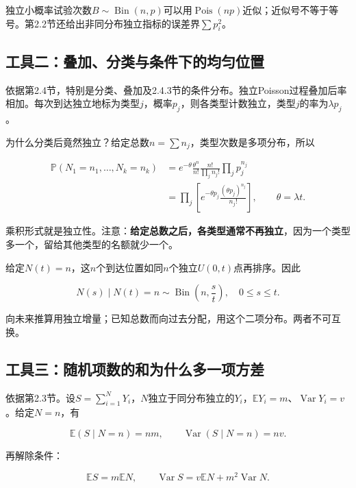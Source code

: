 \documentclass[12pt,a4paper,UTF8,fontset=fandol]{ctexart}
\begin{document}
独立小概率试验次数\(B\sim\operatorname{Bin}(n,p)\)可以用\(\operatorname{Pois}(np)\)近似；近似号不等于等号。第2.2节还给出非同分布独立指标的误差界\(\sum p_i^2\)。

\subsection{工具二：叠加、分类与条件下的均匀位置}\label{ux5de5ux5177ux4e8cux53e0ux52a0ux5206ux7c7bux4e0eux6761ux4ef6ux4e0bux7684ux5747ux5300ux4f4dux7f6e}

依据第2.4节，特别是分类、叠加及2.4.3节的条件分布。独立Poisson过程叠加后率相加。每次到达独立地标为类型\(j\)，概率\(p_j\)，则各类型计数独立，类型\(j\)的率为\(\lambda p_j\)。

为什么分类后竟然独立？给定总数\(n=\sum n_j\)，类型次数是多项分布，所以

\[
\begin{aligned}
\mathbb P(N_1=n_1,\ldots,N_k=n_k)
&=e^{-\theta}\frac{\theta^n}{n!}
 \frac{n!}{\prod_jn_j!}\prod_jp_j^{n_j}\\
&=\prod_j\left[e^{-\theta p_j}\frac{(\theta p_j)^{n_j}}{n_j!}\right],
\qquad \theta=\lambda t.
\end{aligned}
\]

乘积形式就是独立性。注意：\textbf{给定总数之后，各类型通常不再独立}，因为一个类型多一个，留给其他类型的名额就少一个。

给定\(N(t)=n\)，这\(n\)个到达位置如同\(n\)个独立\(U(0,t)\)点再排序。因此

\[
N(s)\mid N(t)=n\sim\operatorname{Bin}\left(n,\frac st\right),\quad0\le s\le t.
\]

向未来推算用独立增量；已知总数而向过去分配，用这个二项分布。两者不可互换。

\subsection{工具三：随机项数的和为什么多一项方差}\label{ux5de5ux5177ux4e09ux968fux673aux9879ux6570ux7684ux548cux4e3aux4ec0ux4e48ux591aux4e00ux9879ux65b9ux5dee}

依据第2.3节。设\(S=\sum_{i=1}^NY_i\)，\(N\)独立于同分布独立的\(Y_i\)，\(\mathbb EY_i=m\)、\(\operatorname{Var}Y_i=v\)。给定\(N=n\)，有

\[
\mathbb E(S\mid N=n)=nm,\qquad
\operatorname{Var}(S\mid N=n)=nv.
\]

再解除条件：

\[
\mathbb ES=m\mathbb EN,\qquad
\operatorname{Var}S=v\mathbb EN+m^2\operatorname{Var}N.
\]
\end{document}
